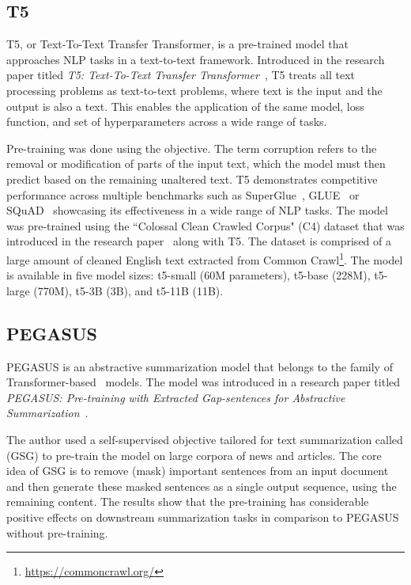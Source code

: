 \documentclass[english, ba, kiv, he, iso690numb, pdf, viewonly]{fasthesis}
\begin{document}
	\subsection{T5} \label{subsec:T5}
	T5, or Text-To-Text Transfer Transformer, is a pre-trained model that approaches NLP tasks in a text-to-text framework. Introduced in the research paper titled \textit{T5: Text-To-Text Transfer Transformer}~\cite{2020t5}, T5 treats all text processing problems as text-to-text problems, where text is the input and the output is also a text. This enables the application of the same model, loss function, and set of hyperparameters across a wide range of tasks. 
	
	Pre-training was done using the  objective. 
	The term corruption refers to the removal or modification of parts of the input text, which the model must then predict based on the remaining unaltered text. T5 demonstrates competitive performance across multiple benchmarks such as SuperGlue~\cite{wang2020superglue}, GLUE~\cite{wang-etal-2018-glue} or SQuAD~\cite{rajpurkar2016squad} showcasing its effectiveness in a wide range of NLP tasks. The model was pre-trained using the “Colossal Clean Crawled Corpus" (C4) dataset that was introduced in the research paper~\cite{2020t5} along with T5. The dataset is comprised of a large amount of cleaned English text extracted from Common Crawl\footnote{\url{https://commoncrawl.org/}}. 
	The model is available in five model sizes: t5-small (60M parameters), t5-base (228M), t5-large (770M), t5-3B (3B), and t5-11B (11B).
	\subsection{PEGASUS}\label{subsec:pegasus}
	PEGASUS is an abstractive summarization model that belongs to the family of Transformer-based~\cite{vaswani2023attention} models. The model was introduced in a research paper titled \textit{PEGASUS: Pre-training with Extracted Gap-sentences for Abstractive Summarization}~\cite{zhang2019pegasus}. 
	
	The author used a self-supervised objective tailored for text summarization called  (GSG) to pre-train the model on large corpora of news and articles. The core idea of GSG is to remove (mask) important sentences from an input document and then generate these masked sentences as a single output sequence, using the remaining content. The results show that the pre-training has considerable positive effects on downstream summarization tasks in comparison to PEGASUS without pre-training. 
	
\end{document}

